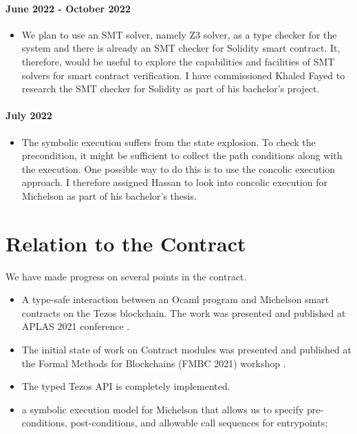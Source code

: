 \documentclass[a4paper,11pt]{article}
\begin{document}
\paragraph{June 2022 - October 2022} 
\begin{itemize}
\item We plan to use an SMT solver, namely Z3  solver, as a type checker for the system and there is already an SMT checker for Solidity smart contract. It, therefore, would be useful to explore the capabilities and facilities of SMT solvers for smart contract verification. I have commissioned Khaled Fayed to research the SMT checker for Solidity as part of his bachelor's project.
\end{itemize}

\paragraph{July 2022}
\begin{itemize}
\item The symbolic execution suffers from the state explosion. To check the precondition, it might be sufficient to collect the path conditions along with the execution. One possible way to do this is to use the concolic execution approach. I therefore assigned Hassan to look into concolic execution for Michelson as part of his bachelor's thesis.
\end{itemize}

\section{Relation to the Contract}
\label{sec:relation-contract}

We have made progress on several points in the contract.
\begin{itemize}
\item A type-safe interaction between an Ocaml program and Michelson smart contracts on the Tezos blockchain. The work was presented and published at APLAS 2021 conference \cite{DBLP:conf/fc/ThiemannAplas21}. 
\item The initial state of work on Contract modules was presented and published at the Formal Methods for Blockchains (FMBC 2021) workshop \cite{DBLP:conf/fc/ThiemannFmbc21}.

\item The typed Tezos API is completely implemented.
\item a symbolic execution model for Michelson that allows us to specify pre-conditions, post-conditions, and allowable call sequences for entrypoints; 
\end{itemize}
\end{document}

